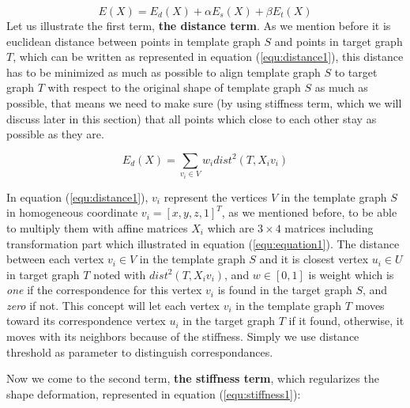 \documentclass[../structure.tex]{subfiles}
\begin{document}
\begin{equation}
E(X) = E_{d}(X) + \alpha E_{s}(X) + \beta E_{t}(X)
\label{equ:costFun}
\end{equation}
Let us illustrate the first term, \textbf{the distance term}. As we mention before it is euclidean distance between points in template graph $S$ and points in target graph $T$, which can be written as represented in equation (\ref{equ:distance1}), this distance has to be minimized as much as possible to align template graph $S$ to target graph $T$ with respect to the original shape of template graph $S$ as much as possible, that means we need to make sure (by using stiffness term, which we will discuss later in this section) that all points which close to each other stay as possible as they are.

\begin{equation}
E_{d}(X) = \sum_{v_{i} \in V} w_{i}dist^2(T,X_{i}v_{i})
\label{equ:distance1}
\end{equation}

In equation (\ref{equ:distance1}), $v_{i}$ represent the vertices $V$ in the template graph $S$ in homogeneous coordinate $v_{i} = [x,y,z,1]^T$, as we mentioned before, to be able to multiply them with affine matrices $X_{i}$ which are $3 \times 4$ matrices including transformation part which illustrated in equation (\ref{equ:equation1}). The distance between each vertex $v_{i} \in V$ in the template graph $S$ and it is closest vertex $u_{i} \in U$ in target graph $T$ noted with $dist^2(T,X_{i}v_{i})$, and $w \in [0,1]$ is weight which is \textit{one} if the correspondence for this vertex $v_{i}$ is found in the target graph $S$, and \textit{zero} if not. This concept will let each vertex $v_{i}$ in the template graph $T$ moves toward its correspondence vertex $u_{i}$ in the target graph $T$ if it found, otherwise, it moves with its neighbors because of the stiffness. Simply we use distance threshold as parameter to distinguish correspondances.

Now we come to the second term, \textbf{the stiffness term}, which regularizes the shape deformation, represented in equation (\ref{equ:stiffness1}):
\end{document}
